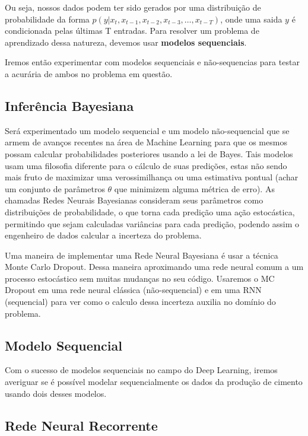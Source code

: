 Ou seja, nossos dados podem ter sido gerados por uma distribuição de probabilidade da forma $p(y | x_{t} ,x_{t -1},x_{t -2},x_{t-3} , \dots, x_{t-T})$, onde uma saida $y$ é condicionada pelas últimas T entradas. Para resolver um problema de aprendizado dessa natureza, devemos usar \textbf{modelos sequenciais}. 

Iremos então experimentar com modelos sequenciais e não-sequencias para testar a acurária de ambos no problema em questão.



\subsection{Inferência Bayesiana}

Será experimentado um modelo sequencial e um modelo não-sequencial que se armem de avanços recentes na área de Machine Learning para que os mesmos possam calcular probabilidades posteriores usando a lei de Bayes. Tais modelos usam uma filosofia diferente para o cálculo de suas predições, estas não sendo mais fruto de maximizar uma verossimilhança ou uma estimativa pontual (achar um conjunto de parâmetros $\theta$ que minimizem alguma métrica de erro). As chamadas Redes Neurais Bayesianas consideram seus parâmetros como distribuições de probabilidade, o que torna cada predição uma ação estocástica, permitindo que sejam calculadas variâncias para cada predição, podendo assim o engenheiro de dados calcular a incerteza do problema.

Uma maneira de implementar uma Rede Neural Bayesiana é usar a técnica Monte Carlo Dropout. Dessa maneira aproximando uma rede neural comum a um processo estocástico sem muitas mudanças no seu código. Usaremos o MC Dropout em uma rede neural clássica (não-sequencial) e em uma RNN (sequencial) para ver como o calculo dessa incerteza auxilia no domínio do problema.

\subsection{Modelo Sequencial}
Com o sucesso de modelos sequenciais no campo do Deep Learning, iremos averiguar se é possível modelar sequencialmente os dados da produção de cimento usando dois desses modelos. 
\\

\subsection{Rede Neural Recorrente}
% 

